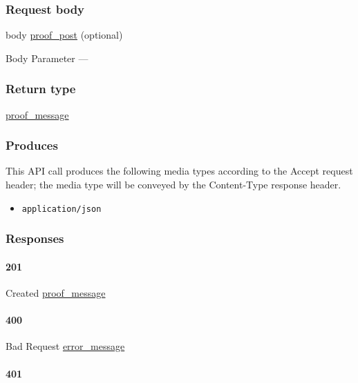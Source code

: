 \hypertarget{request-body-32}{%
\subsubsection{Request body}\label{request-body-32}}

body \protect\hyperlink{proof_post}{proof\_post} (optional)

{Body Parameter} ---

\hypertarget{return-type-77}{%
\subsubsection{Return type}\label{return-type-77}}

\protect\hyperlink{proof_message}{proof\_message}

\hypertarget{produces-97}{%
\subsubsection{Produces}\label{produces-97}}

This API call produces the following media types according to the
{Accept} request header; the media type will be conveyed by the
{Content-Type} response header.

\begin{itemize}
\tightlist
\item
  \texttt{application/json}
\end{itemize}

\hypertarget{responses-99}{%
\subsubsection{Responses}\label{responses-99}}

\hypertarget{section-325}{%
\paragraph{201}\label{section-325}}

Created \protect\hyperlink{proof_message}{proof\_message}

\hypertarget{section-326}{%
\paragraph{400}\label{section-326}}

Bad Request \protect\hyperlink{error_message}{error\_message}

\hypertarget{section-327}{%
\paragraph{401}\label{section-327}}

